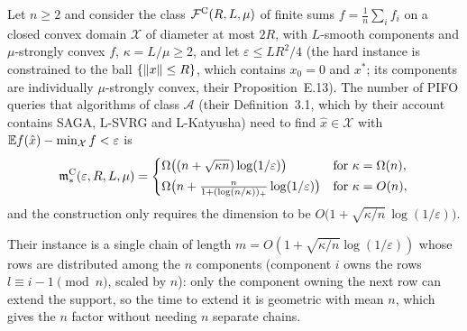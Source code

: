 \begin{theorem}
\label{thm:HXZ}
Let $n\ge2$ and consider the class $\mathcal F^{\rm C}(R,L,\mu)$ of finite sums $f=\frac1n\sum_if_i$ on a closed convex domain $\mathcal X$ of diameter at most $2R$, with $L$-smooth components and $\mu$-strongly convex $f$, $\kappa=L/\mu\ge2$, and let $\varepsilon\le LR^2/4$ (the hard instance is constrained to the ball $\{\left\|x\right\|\le R\}$, which contains $x_0=0$ and $x^\ast$; its components are individually $\mu$-strongly convex, their Proposition~E.13). The number of PIFO queries that algorithms of class $\mathcal A$ (their Definition~3.1, which by their account contains SAGA, L-SVRG and L-Katyusha) need to find $\hat x\in\mathcal X$ with $\mathbb{E} f(\hat x)-\min_{\mathcal X} f<\varepsilon$ is
\[
\mathfrak m_\ast^{\rm C}(\varepsilon,R,L,\mu)=\begin{cases}\Omega\big((n+\sqrt{\kappa n})\log(1/\varepsilon)\big)&\text{for }\kappa=\Omega(n),\\[2pt] \Omega\big(n+\frac{n}{1+(\log(n/\kappa))_+}\log(1/\varepsilon)\big)&\text{for }\kappa=O(n),\end{cases}
\]
and the construction only requires the dimension to be $O\big(1+\sqrt{\kappa/n}\,\log(1/\varepsilon)\big)$.
\end{theorem}

Their instance is a single chain of length $m=O(1+\sqrt{\kappa/n}\log(1/\varepsilon))$ whose rows are distributed among the $n$ components (component $i$ owns the rows $l\equiv i-1 \pmod n$, scaled by $n$): only the component owning the next row can extend the support, so the time to extend it is geometric with mean $n$, which gives the $n$ factor without needing $n$ separate chains.

